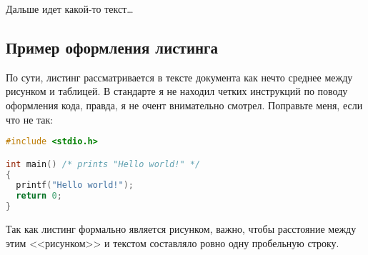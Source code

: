 Дальше идет какой-то текст\dots

\newpage

\subsection{Пример оформления листинга}

По сути, листинг рассматривается в тексте документа как нечто среднее между рисунком и таблицей.
В стандарте я не находил четких инструкций по поводу оформления кода, правда, я не очент внимательно смотрел.
Поправьте меня, если что не так: 

\begin{mdframed}[style=listing]
  \begin{lstlisting}[language=c,caption=Исходный код какой-то программы на C]
#include <stdio.h>

int main() /* prints "Hello world!" */
{ 
  printf("Hello world!"); 
  return 0;
}
\end{lstlisting}
\end{mdframed}

Так как листинг формально является рисунком, важно, чтобы расстояние
между этим <<рисунком>> и текстом составляло ровно одну пробельную строку.


\newpage
